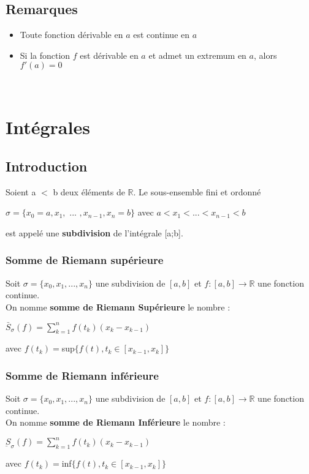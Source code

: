 \documentclass[12pt, a4paper]{book}
\begin{document}
\subsection{Remarques}
\begin{itemize}
    \item Toute fonction dérivable en $a$ est continue en $a$\\
    \item Si la fonction $f$ est dérivable en $a$ et admet un extremum en $a$, alors $f'(a) = 0$\\
\end{itemize}
\newpage
\ \\
\newpage
\section{Intégrales}
\subsection{Introduction}
Soient a $<$ b deux éléments de $\mathbb{R}$. Le sous-ensemble fini et ordonné
\begin{center}
    $\sigma = \{x_0 = a, x_1,$ ... $,x_{n-1},x_n =b\}$ avec $a < x_1< ... < x_{n-1} < b $
\end{center}
est appelé une \textbf{subdivision} de l'intégrale [a;b].

\subsubsection{Somme de Riemann supérieure}
Soit $\sigma = \{x_0, x_1, ... ,x_n\}$ une subdivision de $[a,b]$ et $f:[a,b] \rightarrow \mathbb{R}$ une fonction continue.\\
On nomme \textbf{somme de Riemann Supérieure} le nombre :
\begin{center}
    $\bar{S}_{\sigma}(f)=  \sum_{k=1}^{n} f(t_k)(x_k-x_{k-1})$
\end{center}
avec  $f(t_k) = $sup$ \{f(t), t_k \in [x_{k - 1}, x_k] \}$

\subsubsection{Somme de Riemann inférieure}
Soit $\sigma = \{x_0, x_1, ... ,x_n\}$ une subdivision de $[a,b]$ et $f:[a,b] \rightarrow \mathbb{R}$ une fonction continue.\\
On nomme \textbf{somme de Riemann Inférieure} le nombre :
\begin{center}
    $\underbar{S}_{\sigma}(f)=  \sum_{k=1}^{n} f(t_k)(x_k-x_{k-1})$
\end{center}
avec  $f(t_k) = $inf$ \{f(t), t_k \in [x_{k - 1}, x_k] \}$
\end{document}
